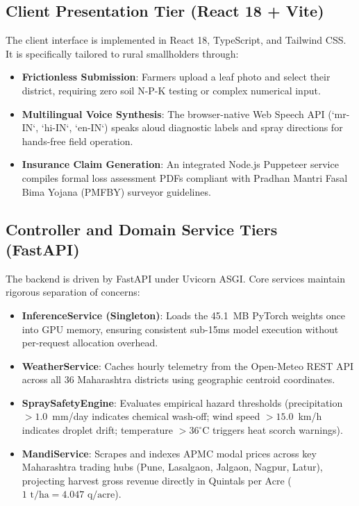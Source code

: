 \documentclass[conference]{IEEEtran}
\begin{document}
\subsection{Client Presentation Tier (React 18 + Vite)}
The client interface is implemented in React 18, TypeScript, and Tailwind CSS. It is specifically tailored to rural smallholders through:
\begin{itemize}
    \item \textbf{Frictionless Submission}: Farmers upload a leaf photo and select their district, requiring zero soil N-P-K testing or complex numerical input.
    \item \textbf{Multilingual Voice Synthesis}: The browser-native Web Speech API (`mr-IN`, `hi-IN`, `en-IN`) speaks aloud diagnostic labels and spray directions for hands-free field operation.
    \item \textbf{Insurance Claim Generation}: An integrated Node.js Puppeteer service compiles formal loss assessment PDFs compliant with Pradhan Mantri Fasal Bima Yojana (PMFBY) surveyor guidelines.
\end{itemize}

\subsection{Controller and Domain Service Tiers (FastAPI)}
The backend is driven by FastAPI under Uvicorn ASGI. Core services maintain rigorous separation of concerns:
\begin{itemize}
    \item \textbf{InferenceService (Singleton)}: Loads the 45.1~MB PyTorch weights once into GPU memory, ensuring consistent sub-15ms model execution without per-request allocation overhead.
    \item \textbf{WeatherService}: Caches hourly telemetry from the Open-Meteo REST API across all 36 Maharashtra districts using geographic centroid coordinates.
    \item \textbf{SpraySafetyEngine}: Evaluates empirical hazard thresholds (precipitation $> 1.0$~mm/day indicates chemical wash-off; wind speed $> 15.0$~km/h indicates droplet drift; temperature $> 36^\circ$C triggers heat scorch warnings).
    \item \textbf{MandiService}: Scrapes and indexes APMC modal prices across key Maharashtra trading hubs (Pune, Lasalgaon, Jalgaon, Nagpur, Latur), projecting harvest gross revenue directly in Quintals per Acre ($1\text{ t/ha} = 4.047\text{ q/acre}$).
\end{itemize}
\end{document}
